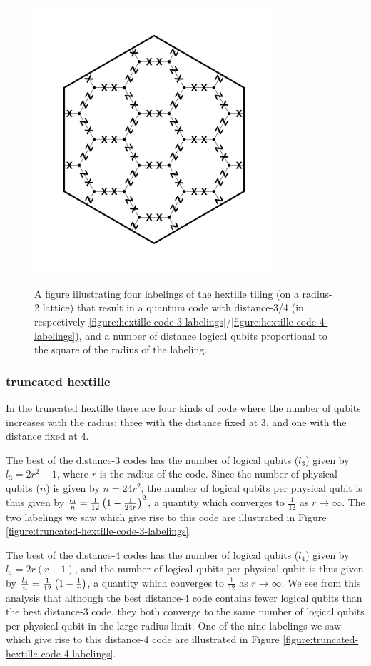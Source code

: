 \documentclass[twocolumn,showpacs,preprintnumbers,amsmath,amssymb,nofootinbib,pra,floatfix]{revtex4-1}
\begin{document}
\begin{figure}
{\includegraphics[width=3.5in]{hextille-code-4-labeling-2} %
}
\caption{
\label{figure:hextille-code-labelings}
A figure illustrating four labelings of the hextille tiling (on a radius-2 lattice) that result in a quantum code with distance-3/4 (in respectively \ref{figure:hextille-code-3-labelings}/\ref{figure:hextille-code-4-labelings}), and a number of distance logical qubits proportional to the square of the radius of the labeling.
}
\end{figure}
\subsubsection{truncated hextille}

In the truncated hextille there are four kinds of code where the number of qubits increases with the radius:  three with the distance fixed at 3, and one with the distance fixed at 4.

The best of the distance-3 codes has the number of logical qubits ($l_3$) given by $l_3=2r^2-1$, where $r$ is the radius of the code.  Since the number of physical qubits ($n$) is given by $n=24r^2$, the number of logical qubits per physical qubit is thus given by $\frac{l_3}{n}=\frac{1}{12}\left(1-\frac{1}{24r}\right)^2$, a quantity which converges to $\frac{1}{12}$ as $r\to\infty$.  The two labelings we saw which give rise to this code are illustrated in Figure \ref{figure:truncated-hextille-code-3-labelings}.

The best of the distance-4 codes has the number of logical qubits ($l_4$) given by $l_4=2r(r-1)$, and the number of logical qubits per physical qubit is thus given by $\frac{l_4}{n}=\frac{1}{12}\left(1-\frac{1}{r}\right)$, a quantity which converges to $\frac{1}{12}$ as $r\to\infty$.  We see from this analysis that although the best distance-4 code contains fewer logical qubits than the best distance-3 code, they both converge to the same number of logical qubits per physical qubit in the large radius limit.  One of the nine labelings we saw which give rise to this distance-4 code are illustrated in Figure \ref{figure:truncated-hextille-code-4-labelings}.
\end{document}
